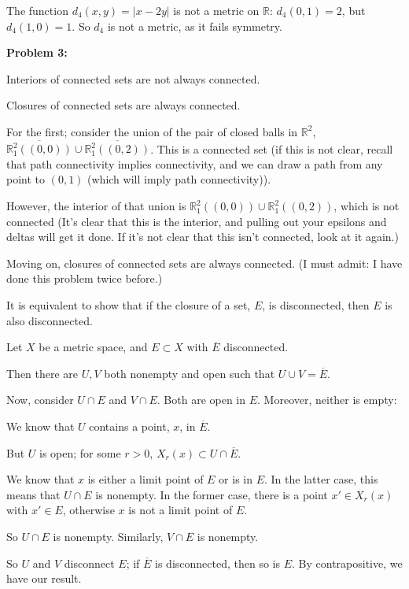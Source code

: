 \documentclass[a4paper,12pt]{article}
\newcommand{\tab}{\hspace{4mm}} %
\newcommand{\shunt}{\vspace{20mm}}
\newcommand{\absval}[1]{\lvert #1 \rvert}
\newcommand{\R}{\mathbb{R}}
\begin{document}
The function $d_4(x,y) = \absval{x -2y}$ is not a metric on $\R$: $d_4(0,1) = 2$, but $d_4(1,0) = 1$. So $d_4$ is not a metric, as it fails symmetry.

\shunt

{\bf Problem 3:}

Interiors of connected sets are not always connected.

Closures of connected sets are always connected. 

For the first; consider the union of the pair of closed balls in $\R^2$, $\overline{\R^2_1((0,0))} \cup \overline{\R^2_1((0,2))}$. This is a connected set (if this is not clear, recall that path connectivity implies connectivity, and we can draw a path from any point to $(0,1)$ (which will imply path connectivity)).

However, the interior of that union is $\R^2_1((0,0)) \cup \R^2_1((0,2))$, which is not connected (It's clear that this is the interior, and pulling out your epsilons and deltas will get it done. If it's not clear that this isn't connected, look at it again.)

Moving on, closures of connected sets are always connected. (I must admit: I have done this problem twice before.)

\tab It is equivalent to show that if the closure of a set, $E$, is disconnected, then $E$ is also disconnected.

\tab Let $X$ be a metric space, and $E \subset X$ with $\overline{E}$ disconnected.

\tab  Then there are $U,V$ both nonempty and open such that $U \cup V = \overline{E}$.

\tab Now, consider $U \cap E$ and $V \cap E$. Both are open in $E$. Moreover, neither is empty:

\tab \tab We know that $U$ contains a point, $x$, in $\overline{E}$.

\tab \tab But $U$ is open; for some $r >0$, $X_r(x) \subset U \cap \overline{E}$.

\tab \tab We know that $x$ is either a limit point of $E$ or is in $E$. In the latter case, this means that $U \cap E$ is nonempty. In the former case, there is a point $x' \in X_r(x)$ with $x' \in E$, otherwise $x$ is not a limit point of $E$. 

\tab \tab So $U \cap E$ is nonempty. Similarly, $V \cap E$ is nonempty.

\tab \tab So $U$ and $V$ disconnect $E$; if $\overline{E}$ is disconnected, then so is $E$. By contrapositive, we have our result.
\end{document}
